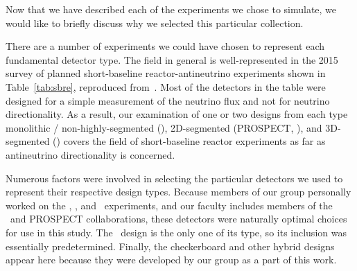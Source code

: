 Now that we have described each of the experiments we chose to simulate, we would like to briefly discuss why we selected this particular collection.

There are a number of experiments we could have chosen to represent each fundamental detector type.
The field in general is well-represented in the 2015 survey of planned short-baseline reactor-antineutrino experiments shown in Table~\ref{tab:sbre}, reproduced from~\cite{Lane:2015alq}. %
Most of the detectors in the table were designed for a simple measurement of the neutrino flux and not for neutrino directionality.
As a result, our examination of one or two designs from each type \dash monolithic / non-highly-segmented (\dc), 2D-segmented (PROSPECT, \sandd), and 3D-segmented (\nl) \dash covers the field of short-baseline reactor experiments as far as antineutrino directionality is concerned.

Numerous factors were involved in selecting the particular detectors we used to represent their respective design types.
Because members of our group personally worked on the \mtc, \nl, and \sandd\ experiments, and our faculty includes members of the \dc\ and PROSPECT collaborations, these detectors were naturally optimal choices for use in this study.
The \santa\ design is the only one of its type, so its inclusion was essentially predetermined.
Finally, the checkerboard and other hybrid designs appear here because they were developed by our group as a part of this work.



